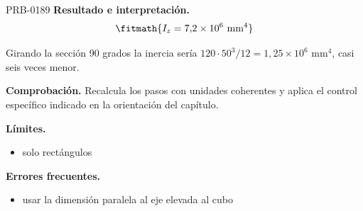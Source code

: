 \begin{studiumworked}{PRB-0189}
\textbf{Resultado e interpretación.}\[\fitmath{I_z = 7{,}2\times 10^{6}\ \mathrm{mm}^{4}}\]

Girando la sección 90 grados la inercia sería $120\cdot 50^3/12 = 1{,}25\times 10^6$ mm$^4$, casi seis veces menor.

\par\textbf{Comprobación.} Recalcula los pasos con unidades coherentes y aplica el control específico indicado en la orientación del capítulo.

\textbf{Límites.}\begin{itemize}\item solo rectángulos\end{itemize}

\textbf{Errores frecuentes.}\begin{itemize}\item usar la dimensión paralela al eje elevada al cubo\end{itemize}

\end{studiumworked}

\Needspace{.3\textheight}

